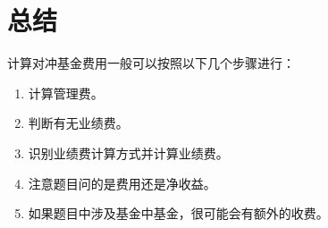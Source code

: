 \documentclass[UTF8]{article}
\begin{document}
\section{总结}
计算对冲基金费用一般可以按照以下几个步骤进行：
\begin{enumerate}[fullwidth,itemindent=3em]
\item 计算管理费。
\item 判断有无业绩费。
\item 识别业绩费计算方式并计算业绩费。
\item 注意题目问的是费用还是净收益。
\item 如果题目中涉及基金中基金，很可能会有额外的收费。
\end{enumerate}
\end{document}
